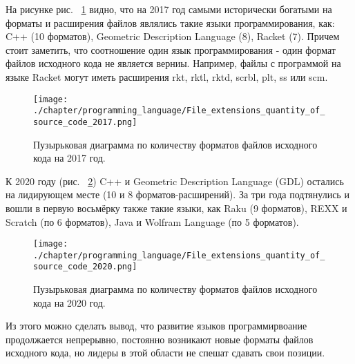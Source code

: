 На рисунке рис. ~\ref{fig:source_files_format_2017} видно, что на 2017 год самыми исторически богатыми на форматы и расширения файлов являлись такие языки программирования, как: C++ (10 форматов), Geometric Description Language (8), Racket (7). Причем стоит заметить, что соотношение один язык программирования - один формат файлов исходного кода не является верниы. Например, файлы с программой на языке Racket могут иметь расширения rkt, rktl, rktd, scrbl, plt, ss или scm.

\begin{figure}[h]
\centering
	\texttt{[image: ./chapter/programming\_language/File\_extensions\_quantity\_of\_source\_code\_2017.png]}
	\caption{Пузырьковая диаграмма по количеству форматов файлов исходного кода на 2017 год.}
	\label{fig:source_files_format_2017}
\end{figure}

К 2020 году (рис. ~\ref{fig:source_files_format_2020}) C++ и Geometric Description Language (GDL) остались на лидирующем месте (10 и 8 форматов-расширений). За три года подтянулись и вошли в первую восьмёрку также такие языки, как Raku (9 форматов), REXX и Scratch (по 6 форматов), Java и Wolfram Language (по 5 форматов).

\begin{figure}[h]
\centering
	\texttt{[image: ./chapter/programming\_language/File\_extensions\_quantity\_of\_source\_code\_2020.png]}
	\caption{Пузырьковая диаграмма по количеству форматов файлов исходного кода на 2020 год.}
	\label{fig:source_files_format_2020}
\end{figure}

Из этого можно сделать вывод, что развитие языков программирвоание продолжается непрерывно, постоянно возникают новые форматы файлов исходного кода, но лидеры в этой области не спешат сдавать свои позиции.